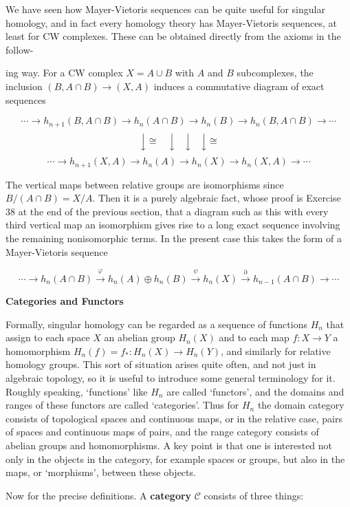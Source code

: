 We have seen how Mayer-Vietoris sequences can be quite useful for singular homology, and in fact every homology theory has Mayer-Vietoris sequences, at least for CW complexes. These can be obtained directly from the axioms in the follow-

ing way. For a CW complex $X = A \cup B$ with $A$ and $B$ subcomplexes, the inclusion
$(B, A \cap B) \to (X, A)$ induces a commutative diagram of exact sequences

\[
\cdots \to h_{n+1}(B, A \cap B) \to h_n(A \cap B) \to h_n(B) \to h_n(B, A \cap B) \to \cdots
\]
\[
\Big\downarrow \cong \quad \Big\downarrow \quad \Big\downarrow \quad \Big\downarrow \cong
\]
\[
\cdots \to h_{n+1}(X, A) \to h_n(A) \to h_n(X) \to h_n(X, A) \to \cdots
\]

The vertical maps between relative groups are isomorphisms since $B/(A \cap B) = X/A$.
Then it is a purely algebraic fact, whose proof is Exercise 38 at the end of the previous
section, that a diagram such as this with every third vertical map an isomorphism
gives rise to a long exact sequence involving the remaining nonisomorphic terms. In
the present case this takes the form of a Mayer-Vietoris sequence

\[
\cdots \to h_n(A \cap B) \xrightarrow{\varphi} h_n(A) \oplus h_n(B) \xrightarrow{\psi} h_n(X) \xrightarrow{\partial} h_{n-1}(A \cap B) \to \cdots
\]

\textbf{Categories and Functors}

Formally, singular homology can be regarded as a sequence of functions $H_n$ that
assign to each space $X$ an abelian group $H_n(X)$ and to each map $f : X \to Y$ a homomorphism $H_n(f) = f_* : H_n(X) \to H_n(Y)$, and similarly for relative homology groups.
This sort of situation arises quite often, and not just in algebraic topology, so it is
useful to introduce some general terminology for it. Roughly speaking, `functions'
like $H_n$ are called `functors', and the domains and ranges of these functors are called
`categories'. Thus for $H_n$ the domain category consists of topological spaces and continuous maps, or in the relative case, pairs of spaces and continuous maps of pairs,
and the range category consists of abelian groups and homomorphisms. A key point
is that one is interested not only in the objects in the category, for example spaces or
groups, but also in the maps, or `morphisms', between these objects.

Now for the precise definitions. A \textbf{category} $\mathcal{C}$ consists of three things:

